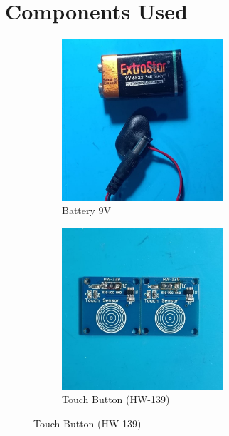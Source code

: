 
\section{Components Used}
\begin{figure}[H]

\begin{subfigure}{0.5\textwidth}
\includegraphics[width=0.9\linewidth, height=6cm]{medias/parts/9v_battery.jpg} 
\caption{Battery 9V}
\label{fig:battery}
\end{subfigure}
\begin{subfigure}{0.5\textwidth}
\includegraphics[width=0.9\linewidth, height=6cm]{medias/parts/touch_sensor.jpg}
\caption{Touch Button (HW-139)}
\label{fig:touchbutton}
\end{subfigure}


\end{figure}
